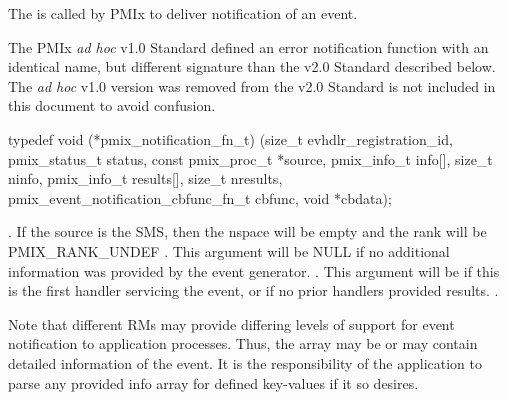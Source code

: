 \summary

The  is called by \ac{PMIx} to deliver notification of an event.

\adviceuserstart
The \ac{PMIx} \textit{ad hoc} v1.0 Standard defined an error notification function with an identical name, but different signature than the v2.0 Standard described below. The \textit{ad hoc} v1.0 version was removed from the v2.0 Standard is not included in this document to avoid confusion.
\adviceuserend


\cspecificstart
\begin{codepar}
typedef void (*pmix_notification_fn_t)
    (size_t evhdlr_registration_id,
     pmix_status_t status,
     const pmix_proc_t *source,
     pmix_info_t info[], size_t ninfo,
     pmix_info_t results[], size_t nresults,
     pmix_event_notification_cbfunc_fn_t cbfunc,
     void *cbdata);
\end{codepar}
\cspecificend

\begin{arglist}
. If the source is the \ac{SMS}, then the nspace will be empty and the rank will be PMIX_RANK_UNDEF
. This argument will be NULL if no additional information was provided by the event generator.
. This argument will be  if this is the first handler servicing the event, or if no prior handlers provided results.
.
\end{arglist}

\descr

Note that different \acp{RM} may provide differing levels of support for event notification to application processes. Thus, the  array may be  or may contain detailed information of the event. It is the responsibility of the application to parse any provided info array for defined key-values if it so desires.


